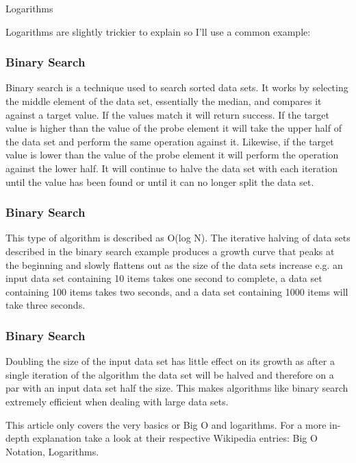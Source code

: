 \documentclass{beamer}
\begin{document}
\begin{frame}
Logarithms

Logarithms are slightly trickier to explain so I'll use a common example:

\end{frame}
\begin{frame}
	\frametitle{Binary Search}
	\large
Binary search is a technique used to search sorted data sets. It works by selecting the middle element of the data set, essentially the median, and compares it against a target value. If the values match it will return success. If the target value is higher than the value of the probe element it will take the upper half of the data set and perform the same operation against it. Likewise, if the target value is lower than the value of the probe element it will perform the operation against the lower half. It will continue to halve the data set with each iteration until the value has been found or until it can no longer split the data set.

\end{frame}
\begin{frame}
		\frametitle{Binary Search}
		\large
This type of algorithm is described as O(log N). The iterative halving of data sets described in the binary search example produces a growth curve that peaks at the beginning and slowly flattens out as the size of the data sets increase e.g. an input data set containing 10 items takes one second to complete, a data set containing 100 items takes two seconds, and a data set containing 1000 items will take three seconds. 

\end{frame}
\begin{frame}
	\frametitle{Binary Search}
	\large
Doubling the size of the input data set has little effect on its growth as after a single iteration of the algorithm the data set will be halved and therefore on a par with an input data set half the size. This makes algorithms like binary search extremely efficient when dealing with large data sets.

This article only covers the very basics or Big O and logarithms. For a more in-depth explanation take a look at their respective Wikipedia entries: Big O Notation, Logarithms.

\end{frame}
\end{document}
